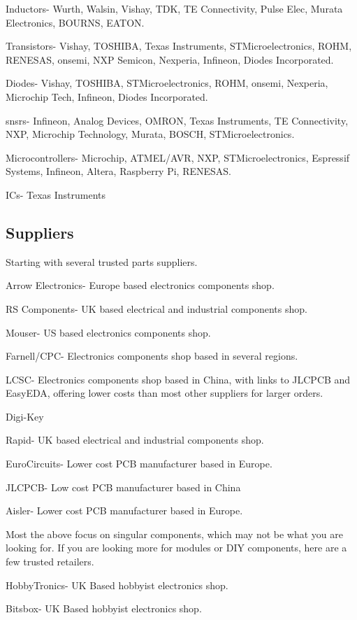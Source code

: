 \documentclass[a4paper,11pt]{report}
\begin{document}
Inductors- Wurth, Walsin, Vishay, TDK, TE Connectivity, Pulse Elec, Murata Electronics, BOURNS, EATON.

Transistors- Vishay, TOSHIBA, Texas Instruments, STMicroelectronics, ROHM, RENESAS, onsemi, NXP Semicon, Nexperia, Infineon, Diodes Incorporated.

Diodes- Vishay, TOSHIBA, STMicroelectronics, ROHM, onsemi, Nexperia, Microchip Tech, Infineon, Diodes Incorporated.

\gls{snsr}s- Infineon, Analog Devices, OMRON, Texas Instruments, TE Connectivity, NXP, Microchip Technology, Murata, BOSCH, STMicroelectronics.

Microcontrollers- Microchip, ATMEL/AVR, NXP, STMicroelectronics, Espressif Systems, Infineon, Altera, Raspberry Pi, RENESAS.

ICs- Texas Instruments

\subsection{Suppliers}

Starting with several trusted parts suppliers.

Arrow Electronics- Europe based electronics components shop.

RS Components- UK based electrical and industrial components shop.

Mouser- US based electronics components shop.

Farnell/CPC- Electronics components shop based in several regions.

LCSC- Electronics components shop based in China, with links to JLCPCB and EasyEDA, offering lower costs than most other suppliers for larger orders.

Digi-Key

Rapid- UK based electrical and industrial components shop.

EuroCircuits- Lower cost PCB manufacturer based in Europe.

JLCPCB- Low cost PCB manufacturer based in China

Aisler- Lower cost PCB manufacturer based in Europe.


Most the above focus on singular components, which may not be what you are looking for. If you are looking more for modules or DIY components, here are a few trusted retailers.

HobbyTronics- UK Based hobbyist electronics shop.

Bitsbox- UK Based hobbyist electronics shop.
\end{document}
